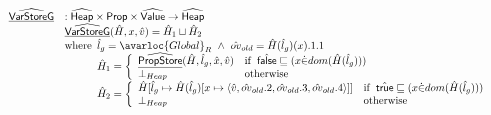 \[\begin{array}{ll}
\ahf{VarStoreG} & : \aHeap \times \SF{Prop} \times \aValue \rightarrow \aHeap \\
& \ahf{VarStoreG}(\hat{H}, x, \hat{v})
  =
  \hat{H}_1 \sqcup \hat{H}_2 \\
&\wherec{
  \hat{l}_g = \avarloc{Global}_R\ \land\ \hat{ov}_{old} = \hat{H}(\hat{l}_g)(x).1.1\\
  \hat{H}_1 =
  \left\{
    \begin{array}{ll}
      \ahf{PropStore}(\hat{H},\hat{l}_g,\hat{x},\hat{v}) & \ifc{\afalse\sqsubseteq(x \dot{\in} dom(\hat{H}(\hat{l}_g)))} \\
      \bot_{Heap} & \owc \\
    \end{array}
   \right.\\ 
  \hat{H}_2 =
  \left\{
    \begin{array}{ll}
      \hat{H}[\hat{l}_g\mapsto \hat{H}(\hat{l}_g)[x \mapsto
        \langle \hat{v},\hat{ov}_{old}.2,\hat{ov}_{old}.3,\hat{ov}_{old}.4\rangle]]
        & \ifc{
          \atrue\sqsubseteq (x \dot{\in} dom(\hat{H}(\hat{l}_g)))\\
        } \\
        \bot_{Heap} & \owc \\
    \end{array}
  \right. \\
}\\
\\

\end{array}
\]

